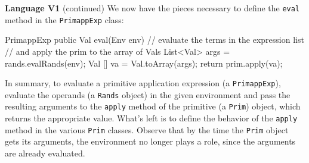 \begin{minipage}[t]{\sw}
\slidenumber
\LARGE
{\bf Language V1} (continued)\exx
We now have the pieces necessary to define the \verb'eval' method
in the \verb'PrimappExp' class:
\Large
\begin{qv}
PrimappExp
    public Val eval(Env env) {
        // evaluate the terms in the expression list
        // and apply the prim to the array of Vals
        List<Val> args = rands.evalRands(env);
        Val [] va = Val.toArray(args);
        return prim.apply(va);
    }
\end{qv}
\LARGE
In summary, to evaluate a primitive application expression (a \verb'PrimappExp'),
evaluate the operands (a \verb'Rands' object) in the given environment
and pass the resulting arguments to the \verb'apply' method
of the primitive (a \verb'Prim') object,
which returns the appropriate value.\exx
What's left is to define the behavior of the \verb'apply' method
in the various \verb'Prim' classes.
Observe that by the time the \verb'Prim'
object gets its arguments,
the environment no longer plays a role,
since the arguments are already evaluated.
\end{minipage}
